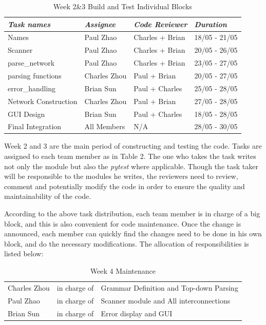 \documentclass[12pt]{article}
\def\n{\noindent}
\begin{document}
\begin{table}[H]
\begin{tabular}{p{4.5cm}p{3.5cm}p{4cm}p{2.5cm}}
\textit{Task names} & \textit{Assignee} & \textit{Code Reviewer} & \textit{Duration}\\
\hline
Names & Paul Zhao & Charles + Brian & 18/05 - 21/05\\
Scanner & Paul Zhao & Charles + Brian & 20/05 - 26/05\\
parse\_network & Paul Zhao & Charles + Brian & 23/05 - 27/05\\
parsing functions & Charles Zhou & Paul + Brian & 20/05 - 27/05\\
error\_handling & Brian Sun & Paul + Charles & 25/05 - 28/05\\
Network Construction & Charles Zhou & Paul + Brian & 27/05 - 28/05\\
GUI Design & Brian Sun & Paul + Charles & 18/05 - 28/05\\
Final Integration & All Members & N/A & 28/05 - 30/05\\
\end{tabular}
\caption{Week 2\&3 Build and Test Individual Blocks}
\end{table}

\n Week 2 and 3 are the main period of constructing and testing the code. Tasks are assigned to each team member as in Table 2. The one who takes the task writes not only the module but also the \textit{pytest} where applicable. Though the task taker will be responsible to the modules he writes, the reviewers need to review, comment and potentially modify the code in order to ensure the quality and maintainability of the code. \par
\vspace{0.3cm}

\n According to the above task distribution, each team member is in charge of a big block, and this is also convenient for code maintenance. Once the change is announced, each member can quickly find the changes need to be done in his own block, and do the necessary modifications. The allocation of responsibilities is listed below:

\begin{table}[H]
\begin{tabular}{p{3cm}p{4cm}p{8cm}}
Charles Zhou & in charge of & Grammar Definition and Top-down Parsing\\
Paul Zhao & in charge of & Scanner module and All interconnections\\
Brian Sun & in charge of & Error display and GUI\\
\end{tabular}
\caption{Week 4 Maintenance}
\end{table}
\end{document}
